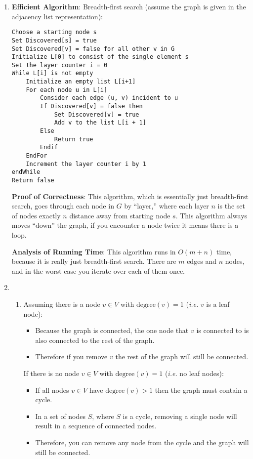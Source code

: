 \documentclass[a4paper, 10pt]{article}
\begin{document}
\begin{enumerate}
	\item \textbf{Efficient Algorithm}: Breadth-first search (assume the graph
		is given in the adjacency list representation):

\begin{lstlisting}
Choose a starting node s
Set Discovered[s] = true
Set Discovered[v] = false for all other v in G
Initialize L[0] to consist of the single element s
Set the layer counter i = 0
While L[i] is not empty
	Initialize an empty list L[i+1]
	For each node u in L[i]
		Consider each edge (u, v) incident to u
		If Discovered[v] = false then
			Set Discovered[v] = true
			Add v to the list L[i + 1]
		Else
			Return true
		Endif
	EndFor
	Increment the layer counter i by 1
endWhile
Return false
\end{lstlisting}

		\textbf{Proof of Correctness}: This algorithm, which is essentially just
		breadth-first search, goes through each node in $G$ by ``layer,''
		where each layer $n$ is the set of nodes exactly $n$ distance away from
		starting node $s$. This algorithm always moves ``down'' the graph, if
		you encounter a node twice it means there is a loop.

		\textbf{Analysis of Running Time}: This algorithm runs in $O(m + n)$
		time, because it is really just breadth-first search. There are $m$
		edges and $n$ nodes, and in the worst case you iterate over each of them
		once.

	\item \begin{enumerate}
			\item
				Assuming there is a node $v \in V$ with $\textrm{degree} (v) =
				1$ (\textit{i.e.} $v$ is a leaf node):

				\begin{itemize}
					\item Because the graph is connected, the one node that $v$
						is connected to is also connected to the rest of the
						graph.
					\item Therefore if you remove $v$ the rest of the graph will
						still be connected.

				\end{itemize}

				If there is no node $v \in V$ with $\textrm{degree} (v) = 1$
				(\textit{i.e.} no leaf nodes):

				\begin{itemize}
					\item If all nodes $v \in V$ have $\textrm{degree} (v) > 1$
						then the graph must contain a cycle.
					\item In a set of nodes $S$, where $S$ is a cycle, removing
						a single node will result in a sequence of connected
						nodes.
					\item Therefore, you can remove any node from the cycle and
						the graph will still be connected.
				\end{itemize}


\end{enumerate}
\end{enumerate}
\end{document}

